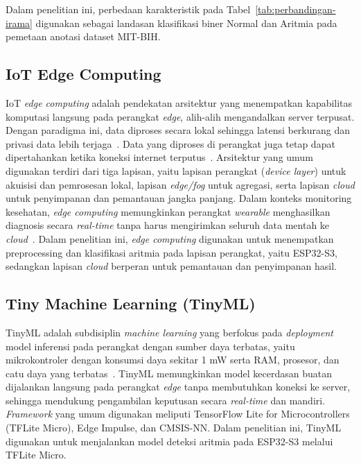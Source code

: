 Dalam penelitian ini, perbedaan karakteristik pada
Tabel~\ref{tab:perbandingan-irama} digunakan sebagai landasan klasifikasi
biner Normal dan Aritmia pada pemetaan anotasi dataset MIT-BIH.

\subsection{IoT Edge Computing}

IoT \textit{edge computing} adalah pendekatan arsitektur yang menempatkan kapabilitas komputasi langsung pada perangkat \textit{edge}, alih-alih mengandalkan server terpusat. Dengan paradigma ini, data diproses secara lokal sehingga latensi berkurang dan privasi data lebih terjaga~\cite{cao_2020}. Data yang diproses di perangkat juga tetap dapat dipertahankan ketika koneksi internet terputus~\cite{yaacoub_2020}. Arsitektur yang umum digunakan terdiri dari tiga lapisan, yaitu lapisan perangkat (\textit{device layer}) untuk akuisisi dan pemrosesan lokal, lapisan \textit{edge/fog} untuk agregasi, serta lapisan \textit{cloud} untuk penyimpanan dan pemantauan jangka panjang. Dalam konteks monitoring kesehatan, \textit{edge computing} memungkinkan perangkat \textit{wearable} menghasilkan diagnosis secara \textit{real-time} tanpa harus mengirimkan seluruh data mentah ke \textit{cloud}~\cite{tinyml_iot_review}. Dalam penelitian ini, \textit{edge computing} digunakan untuk menempatkan preprocessing dan klasifikasi aritmia pada lapisan perangkat, yaitu ESP32-S3, sedangkan lapisan \textit{cloud} berperan untuk pemantauan dan penyimpanan hasil.

\subsection{Tiny Machine Learning (TinyML)}

TinyML adalah subdisiplin \textit{machine learning} yang berfokus pada
\textit{deployment} model inferensi pada perangkat dengan sumber daya
terbatas, yaitu mikrokontroler dengan konsumsi daya sekitar 1 mW serta RAM,
prosesor, dan catu daya yang terbatas~\cite{tinyml_iot_review}.
TinyML memungkinkan model kecerdasan buatan
dijalankan langsung pada perangkat \textit{edge} tanpa membutuhkan koneksi ke
server, sehingga mendukung pengambilan keputusan secara \textit{real-time} dan
mandiri. \textit{Framework} yang umum digunakan meliputi TensorFlow Lite for
Microcontrollers (TFLite Micro), Edge Impulse, dan CMSIS-NN. Dalam
penelitian ini, TinyML digunakan untuk menjalankan model deteksi aritmia
pada ESP32-S3 melalui TFLite Micro.

